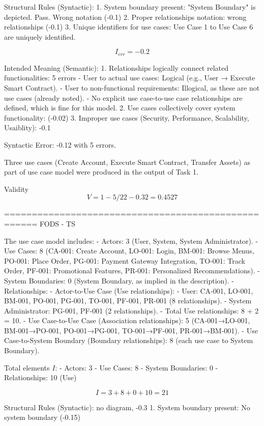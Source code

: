 Structural Rules (Syntactic):
1. System boundary present: "System Boundary" is depicted. Pass. Wrong notation (-0.1)
2. Proper relationships notation: wrong relationships (-0.1)
3. Unique identifiers for use cases: Use Case 1 to Use Case 6 are uniquely identified. 

\[
I_{err} = -0.2 
\]

Intended Meaning (Semantic):
1. Relationships logically connect related functionalities: 5 errors
- User to actual use cases: Logical (e.g., User → Execute Smart Contract).
- User to non-functional requirements: Illogical, as these are not use cases (already noted).
- No explicit use case-to-use case relationships are defined, which is fine for this model.
2. Use cases collectively cover system functionality: (-0.02)
3. Improper use cases (Security, Performance, Scalability, Usaiblity): -0.1

Syntactic Error: -0.12 with 5 errors. 

Three use cases (Create Account, Execute Smart Contract, Transfer Assets) as part of use case model were produced in the output of Task 1. 

Validity
\[
V = 1 - 5/22 - 0.32 = 0.4527
\]

====================================================
FODS - TS

The use case model includes:
- Actors: 3 (User, System, System Administrator).
- Use Cases: 8 (CA-001: Create Account, LO-001: Login, BM-001: Browse Menus, PO-001: Place Order, PG-001: Payment Gateway Integration, TO-001: Track Order, PF-001: Promotional Features, PR-001: Personalized Recommendations).
- System Boundaries: 0 (System Boundary, as implied in the description).
- Relationships:
- Actor-to-Use Case (Use relationships):
- User: CA-001, LO-001, BM-001, PO-001, PG-001, TO-001, PF-001, PR-001 (8 relationships).
- System Administrator: PG-001, PF-001 (2 relationships).
- Total Use relationships: 8 + 2 = 10.
- Use Case-to-Use Case (Association relationships): 5 (CA-001→LO-001, BM-001→PO-001, PO-001→PG-001, TO-001→PF-001, PR-001→BM-001).
- Use Case-to-System Boundary (Boundary relationships): 8 (each use case to System Boundary).

Total elements \( I \):
- Actors: 3
- Use Cases: 8
- System Boundaries: 0
- Relationships: 10 (Use) 

\[
I =3 + 8 + 0 + 10 = 21
\]

Structural Rules (Syntactic): no diagram, -0.3
1. System boundary present: No system boundary (-0.15)

